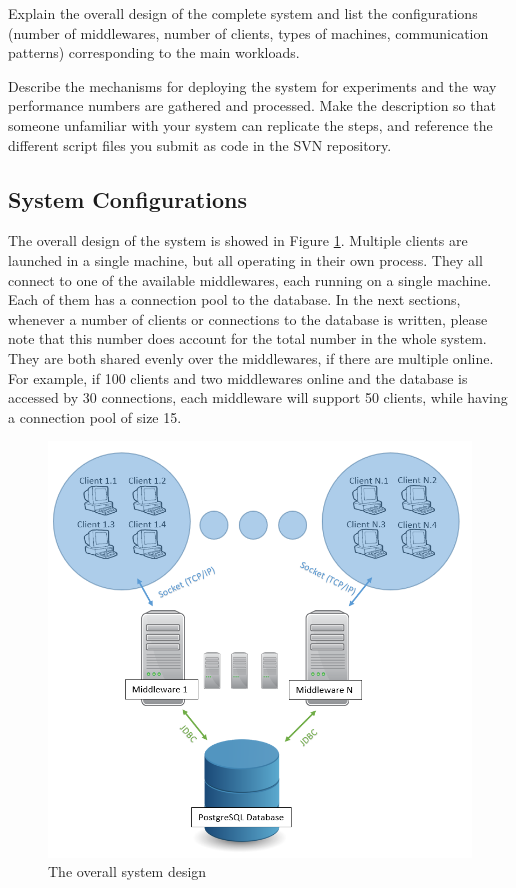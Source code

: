 \documentclass[11pt]{article}
\begin{document}
Explain the overall design of the complete system and list the
configurations (number of middlewares, number of clients, types of
machines, communication patterns) corresponding to the main workloads.

Describe the mechanisms for deploying the system for experiments and the
way performance numbers are gathered and processed. Make the description
so that someone unfamiliar with your system can replicate the steps, and
reference the different script files you submit as code in the SVN
repository.

\subsection{System Configurations}\label{sec:system-configurations}
The overall design of the system is showed in Figure \ref{fig:overall_design}. Multiple clients are launched in a single machine, but all operating in their own process. They all connect to one of the available middlewares, each running on a single machine. Each of them has a connection pool to the database. In the next sections, whenever a number of clients or connections to the database is written, please note that this number does account for the total number in the whole system. They are both shared evenly over the middlewares, if there are multiple online. For example, if 100 clients and two middlewares online and the database is accessed by 30 connections, each middleware will support 50 clients, while having a connection pool of size 15.
\begin{figure}
\centering
\includegraphics[width=0.7\linewidth]{figures/overall_design}
\caption{The overall system design}
\label{fig:overall_design}
\end{figure}
\end{document}
